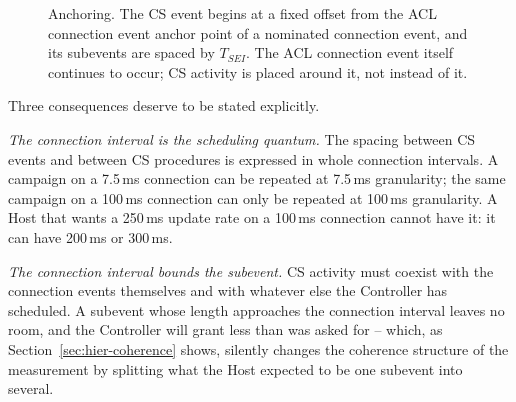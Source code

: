 \documentclass[11pt,a4paper]{article}
\newcommand{\Tconn}{T_{C}}
\newcommand{\Tsei}{T_{SEI}}
\newcommand{\Nse}{N_{SE}}
\begin{document}
\begin{figure}[h]
\centering
{}
\caption{Anchoring. The CS event begins at a fixed offset from the ACL connection event anchor point
of a nominated connection event, and its subevents are spaced by $\Tsei$. The ACL connection event
itself continues to occur; CS activity is placed around it, not instead of it.}
\label{fig:anchor}
\end{figure}

Three consequences deserve to be stated explicitly.

\emph{The connection interval is the scheduling quantum.} The spacing between CS events and between
CS procedures is expressed in whole connection intervals. A campaign on a 7.5\,ms connection can be
repeated at 7.5\,ms granularity; the same campaign on a 100\,ms connection can only be repeated at
100\,ms granularity. A Host that wants a 250\,ms update rate on a 100\,ms connection cannot have it:
it can have 200\,ms or 300\,ms.

\emph{The connection interval bounds the subevent.} CS activity must coexist with the connection
events themselves and with whatever else the Controller has scheduled. A subevent whose length
approaches the connection interval leaves no room, and the Controller will grant less than was asked
for -- which, as Section~\ref{sec:hier-coherence} shows, silently changes the coherence structure of
the measurement by splitting what the Host expected to be one subevent into several.
\end{document}

